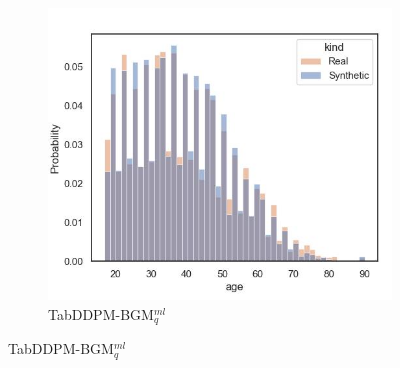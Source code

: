 \begin{figure}[h]
\begin{subfigure}{0.32\textwidth}
		\centering
		\includegraphics[width=\textwidth]{images/dist_age/tab-ddpm-bgm.jpg}
		\caption{TabDDPM-BGM$^{ml}_q$}
	\end{subfigure}



\end{figure}
